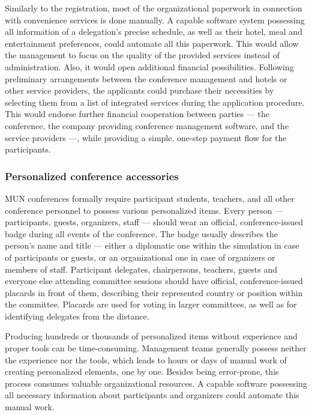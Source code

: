 Similarly to the registration, most of the organizational paperwork in connection with convenience services is done manually. A capable software system possessing all information of a delegation's precise schedule, as well as their hotel, meal and entertainment preferences, could automate all this paperwork. This would allow the management to focus on the quality of the provided services instead of administration. Also, it would open additional financial possibilities. Following preliminary arrangements between the conference management and hotels or other service providers, the applicants could purchase their necessities by selecting them from a list of integrated services during the application procedure. This would endorse further financial cooperation between parties — the conference, the company providing conference management software, and the service providers —, while providing a simple, one-step payment flow for the participants.

\subsubsection{Personalized conference accessories}

MUN conferences formally require participant students, teachers, and all other conference personnel to possess various personalized items. Every person — participants, guests, organizers, staff — should wear an official, conference-issued badge during all events of the conference. The badge usually describes the person's name and title — either a diplomatic one within the simulation in case of participants or guests, or an organizational one in case of organizers or members of staff. Participant delegates, chairpersons, teachers, guests and everyone else attending committee sessions should have official, conference-issued placards in front of them, describing their represented country or position within the committee. Placards are used for voting in larger committees, as well as for identifying delegates from the distance.

Producing hundreds or thousands of personalized items without experience and proper tools can be time-consuming. Management teams generally possess neither the experience nor the tools, which leads to hours or days of manual work of creating personalized elements, one by one. Besides being error-prone, this process consumes valuable organizational resources. A capable software possessing all necessary information about participants and organizers could automate this manual work.

